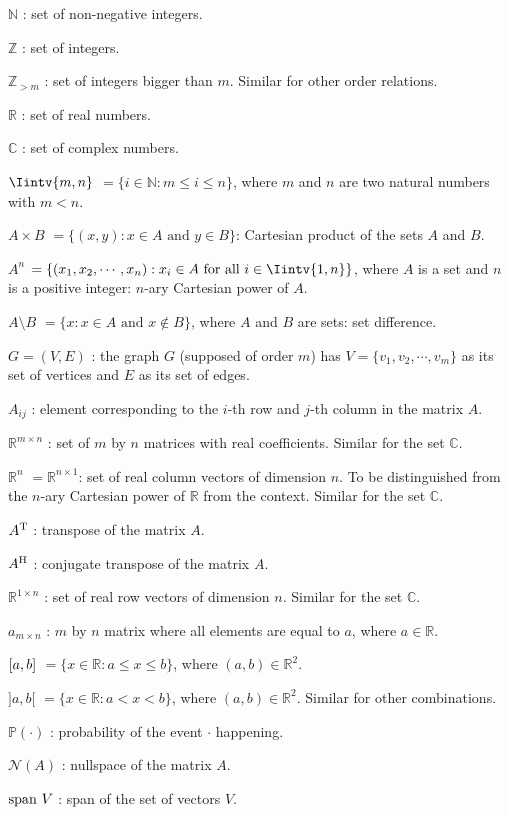 \begin{abbrv}
\item[$\mathbb N$]: set of non-negative integers.
\item[$\mathbb Z$]: set of integers.
\item[$ \mathbb Z_{>m}$]: set of integers bigger than $m$. Similar for other order relations.
\item[$\mathbb R$]: set of real numbers.
\item[$\mathbb C$]: set of complex numbers.
\item[$\Iintv{m,n}$] $= \{ i \in \mathbb N: m \le i \le n \}$, where $m$ and $n$ are two natural numbers with $m < n$.
\item[$A \times B$] $= \{ (x,y): x \in A \text{ and } y \in B \}$:  Cartesian product of the sets $A$ and $B$.
\item[$A^n$]  $= \{ (x_1, x_2, \cdots, x_n): x_i \in A \text{ for all } i \in \Iintv{1,n} \}$, where $A$ is a set and $n$ is a positive integer: $n$-ary Cartesian power of $A$.
\item[$A \setminus B$] $=\{x: x \in A \text{ and } x \notin B \}$, where $A$ and $B$ are sets: set difference.
\item[$G = (V,E)$] : the graph $G$ (supposed of order $m$) has $V = \{ v_1, v_2, \cdots, v_m \}$ as its set of vertices and $E$ as its set of edges.
\item[$A_{ij}$] : element corresponding to the $i$-th row and $j$-th column in the matrix $A$.
\item[$\mathbb R ^{m \times n}$] : set of $m$ by $n$ matrices with real coefficients. Similar for the set $\mathbb C$.
\item[$\mathbb R^n$] $= \mathbb R^{n \times 1}$: set of real column vectors of dimension $n$. To be distinguished from the $n$-ary Cartesian power of $\mathbb R$ from the context. Similar for the set $\mathbb C$.
\item[$A^{\rm T}$] : transpose of the matrix $A$.
\item[$A^{\rm H}$]: conjugate transpose of the matrix $A$.
\item[$\mathbb R^{1 \times n}$]: set of real row vectors of dimension $n$. Similar for the set $\mathbb C$.
\item[$a_{m \times n}$]: $m$ by $n$ matrix where all elements are equal to $a$, where $a \in \mathbb R$.
\item[$ { \interval{a} {b}  }  $]  $= \{ x \in \mathbb R: a \le x \le b \} $, where $(a,b) \in \mathbb R^2$.
\item[ ${ ] a , b [ }$ ] $= \{ x \in \mathbb R: a < x < b \}$, where $(a,b) \in \mathbb R^2$. Similar for other combinations.
\item[ $\mathbb P ( \cdot )$]: probability of the event $\cdot$ happening.
\item[$\mathcal N (A)$]: nullspace of the matrix $A$.
\item[$\operatorname{span\,} V$]: span of the set of vectors $V$.
\end{abbrv}

